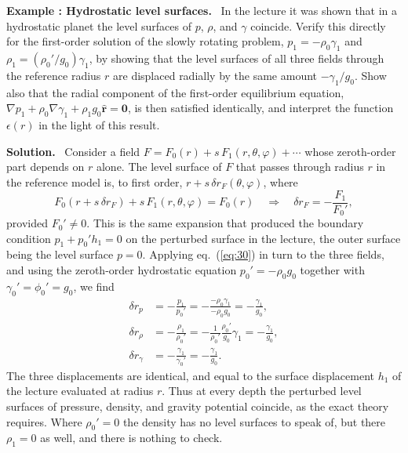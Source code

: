\documentclass[a4paper,12pt]{paper}
\newcounter{example}
\renewenvironment{example}[1]{%
  \refstepcounter{example}%
  \begin{mdframed}[linewidth=1pt,innertopmargin=6pt,innerbottommargin=6pt]%
  \noindent\textbf{Example \theexample: #1.}\ }{%
  \end{mdframed}}
\newenvironment{solution}{\par\noindent\textbf{Solution.}\ }{\par\medskip}
\begin{document}
\begin{example}{Hydrostatic level surfaces}
In the lecture it was shown that in a hydrostatic planet the level surfaces of $p$, $\rho$, and
$\gamma$ coincide. Verify this directly for the first-order solution of the slowly rotating
problem, $p_{1}=-\rho_{0}\gamma_{1}$ and $\rho_{1}=(\rho_{0}'/g_{0})\gamma_{1}$, by showing that the level
surfaces of all three fields through the reference radius $r$ are displaced radially by the same
amount $-\gamma_{1}/g_{0}$. Show also that the radial component of the first-order equilibrium
equation, $\nabla p_{1}+\rho_{0}\nabla\gamma_{1}+\rho_{1}g_{0}\hat{\mathbf{r}}=\mathbf{0}$, is then
satisfied identically, and interpret the function $\epsilon(r)$ in the light of this result.
\end{example}

\begin{solution}
Consider a field $F=F_{0}(r)+s\,F_{1}(r,\theta,\varphi)+\cdots$ whose zeroth-order part depends on $r$
alone. The level surface of $F$ that passes through radius $r$ in the reference model is, to first
order, $r+s\,\delta r_{F}(\theta,\varphi)$, where
\begin{equation}
F_{0}(r+s\,\delta r_{F})+s\,F_{1}(r,\theta,\varphi)=F_{0}(r)
\quad\Longrightarrow\quad
\delta r_{F}=-\frac{F_{1}}{F_{0}'},
\label{eq:30}
\end{equation}
provided $F_{0}'\neq0$. This is the same expansion that produced the boundary condition
$p_{1}+p_{0}'h_{1}=0$ on the perturbed surface in the lecture, the outer surface being the level
surface $p=0$. Applying eq.~(\ref{eq:30}) in turn to the three fields, and using the zeroth-order
hydrostatic equation $p_{0}'=-\rho_{0}g_{0}$ together with $\gamma_{0}'=\phi_{0}'=g_{0}$, we find
\begin{align}
\delta r_{p}&=-\frac{p_{1}}{p_{0}'}=-\frac{-\rho_{0}\gamma_{1}}{-\rho_{0}g_{0}}=-\frac{\gamma_{1}}{g_{0}},\label{eq:31}\\
\delta r_{\rho}&=-\frac{\rho_{1}}{\rho_{0}'}=-\frac{1}{\rho_{0}'}\frac{\rho_{0}'}{g_{0}}\gamma_{1}=-\frac{\gamma_{1}}{g_{0}},\label{eq:32}\\
\delta r_{\gamma}&=-\frac{\gamma_{1}}{\gamma_{0}'}=-\frac{\gamma_{1}}{g_{0}}.\label{eq:33}
\end{align}
The three displacements are identical, and equal to the surface displacement $h_{1}$ of the lecture
evaluated at radius $r$. Thus at every depth the perturbed level surfaces of pressure, density, and
gravity potential coincide, as the exact theory requires. Where $\rho_{0}'=0$ the density has no
level surfaces to speak of, but there $\rho_{1}=0$ as well, and there is nothing to check.


\end{solution}
\end{document}
